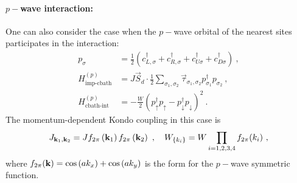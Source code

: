 \documentclass[reprint,hidelinks,onecolumn]{revtex4-2}
\begin{document}
\paragraph{\(p-\)wave interaction:} One can also consider the case when the \(p-\)wave orbital of the nearest sites participates in the interaction:
\begin{equation}\begin{aligned}
	p_{\sigma} &= \frac{1}{2}\left(c^\dagger_{L,\sigma} + c^\dagger_{R,\sigma} + c^\dagger_{U\sigma} + c^\dagger_{D\sigma}\right)~,\\
	H^{(p)}_\text{imp-cbath} &= J\vec{S}_d\cdot\frac{1}{2}\sum_{\sigma_1,\sigma_2}\vec{\tau}_{\sigma_1,\sigma_2} p^\dagger_{\sigma_1}p_{\sigma_2}~,\\
	H^{(p)}_\text{cbath-int} &= -\frac{W}{2}\left(p^\dagger_{\uparrow}p_{\uparrow} - p^\dagger_{\downarrow}p_{\downarrow}\right)^2~.
\end{aligned}\end{equation}
The momentum-dependent Kondo coupling in this case is 
\begin{equation}\begin{aligned}\label{p-wave k-space}
	J_{{\bf k}_1, {\bf k}_2} = J f_{{2\pi}}\left({\bf k}_1\right) f_{{2\pi}}\left({\bf k}_2\right) ~, \quad W_{\left\{ k_i \right\} } = W\prod_{i=1,2,3,4}f_{{2\pi}}(k_i)~,
\end{aligned}\end{equation}
where \(f_{2\pi}({\bf k}) = \cos\left( ak_x \right) + \cos\left( ak_y \right)\) is the form for the \(p-\)wave symmetric function.
\end{document}

